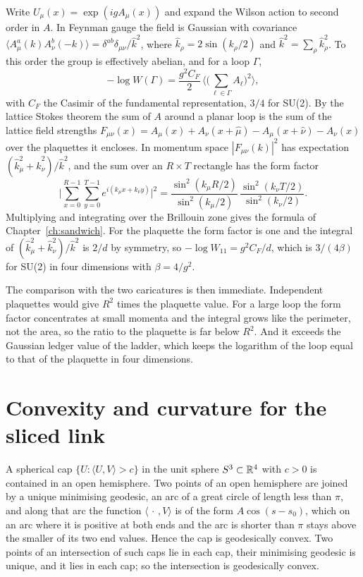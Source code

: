 Write $U_\mu(x)=\exp(igA_\mu(x))$ and expand the Wilson action to second order in $A$. In Feynman gauge the field is Gaussian with covariance $\langle A^a_\mu(k)A^b_\nu(-k)\rangle=\delta^{ab}\delta_{\mu\nu}/\hat k^2$, where $\hat k_\rho=2\sin(k_\rho/2)$ and $\hat k^2=\sum_\rho\hat k_\rho^2$. To this order the group is effectively abelian, and for a loop $\Gamma$,
\[
-\log W(\Gamma)=\frac{g^2C_F}{2}\,\Big\langle\Big(\sum_{\ell\in\Gamma}A_\ell\Big)^2\Big\rangle ,
\]
with $C_F$ the Casimir of the fundamental representation, $3/4$ for SU(2). By the lattice Stokes theorem the sum of $A$ around a planar loop is the sum of the lattice field strengths $F_{\mu\nu}(x)=A_\mu(x)+A_\nu(x+\hat\mu)-A_\mu(x+\hat\nu)-A_\nu(x)$ over the plaquettes it encloses. In momentum space $|F_{\mu\nu}(k)|^2$ has expectation $(\hat k_\mu^2+\hat k_\nu^2)/\hat k^2$, and the sum over an $R\times T$ rectangle has the form factor
\[
\Big|\sum_{x=0}^{R-1}\sum_{y=0}^{T-1}e^{i(k_\mu x+k_\nu y)}\Big|^2=\frac{\sin^2(k_\mu R/2)}{\sin^2(k_\mu/2)}\,\frac{\sin^2(k_\nu T/2)}{\sin^2(k_\nu/2)} .
\]
Multiplying and integrating over the Brillouin zone gives the formula of Chapter~\ref{ch:sandwich}. For the plaquette the form factor is one and the integral of $(\hat k_\mu^2+\hat k_\nu^2)/\hat k^2$ is $2/d$ by symmetry, so $-\log W_{11}=g^2C_F/d$, which is $3/(4\beta)$ for SU(2) in four dimensions with $\beta=4/g^2$.

The comparison with the two caricatures is then immediate. Independent plaquettes would give $R^2$ times the plaquette value. For a large loop the form factor concentrates at small momenta and the integral grows like the perimeter, not the area, so the ratio to the plaquette is far below $R^2$. And it exceeds the Gaussian ledger value of the ladder, which keeps the logarithm of the loop equal to that of the plaquette in four dimensions.

\section{Convexity and curvature for the sliced link}

A spherical cap $\{U:\langle U,V\rangle>c\}$ in the unit sphere $S^3\subset\mathbb{R}^4$ with $c>0$ is contained in an open hemisphere. Two points of an open hemisphere are joined by a unique minimising geodesic, an arc of a great circle of length less than $\pi$, and along that arc the function $\langle\,\cdot\,,V\rangle$ is of the form $A\cos(s-s_0)$, which on an arc where it is positive at both ends and the arc is shorter than $\pi$ stays above the smaller of its two end values. Hence the cap is geodesically convex. Two points of an intersection of such caps lie in each cap, their minimising geodesic is unique, and it lies in each cap; so the intersection is geodesically convex.

